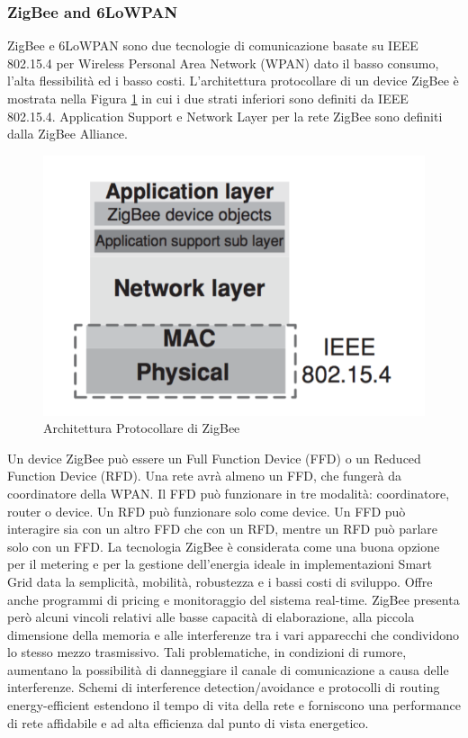 \subsubsection{ZigBee and 6LoWPAN}
ZigBee e 6LoWPAN sono due tecnologie di comunicazione basate su IEEE 802.15.4 per Wireless Personal Area Network (WPAN) dato il basso consumo, l'alta flessibilità ed i basso costi. L'architettura protocollare di un device ZigBee è mostrata nella Figura \ref{fig:zbprot} in cui i due strati inferiori sono definiti da IEEE 802.15.4. Application Support e Network Layer per la rete ZigBee sono definiti dalla ZigBee Alliance\cite{zb}.
\begin{figure}[h]
	\centering
	\includegraphics[scale=0.400]{imgs/zbprot.png}
	\caption{Architettura Protocollare di ZigBee} \label{fig:zbprot}
\end{figure}\newpage
Un device ZigBee può essere un Full Function Device (FFD) o un Reduced Function Device (RFD). Una rete avrà almeno un FFD, che fungerà da coordinatore della WPAN. Il FFD può funzionare in tre modalità: coordinatore, router o device. Un RFD può funzionare solo come device. Un FFD può interagire sia con un altro FFD che con un RFD, mentre un RFD può parlare solo con un FFD.
La tecnologia ZigBee è considerata come una buona opzione per il metering e per la gestione dell'energia ideale in implementazioni Smart Grid data la semplicità, mobilità, robustezza e i bassi costi di sviluppo. Offre anche programmi di pricing e monitoraggio del sistema real-time. ZigBee presenta però alcuni vincoli relativi alle basse capacità di elaborazione, alla piccola dimensione della memoria e alle interferenze tra i vari apparecchi che condividono lo stesso mezzo trasmissivo. Tali problematiche, in condizioni di rumore, aumentano la possibilità di danneggiare il canale di comunicazione a causa delle interferenze. Schemi di interference detection/avoidance e protocolli di routing energy-efficient estendono il tempo di vita della rete e forniscono una performance di rete affidabile e ad alta efficienza dal punto di vista energetico.
